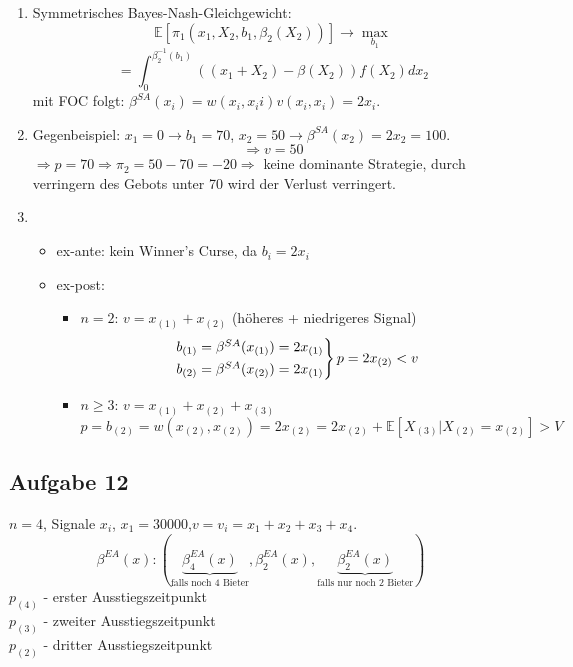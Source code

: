\documentclass[12pt]{extreport} %
\theoremstyle{named}
\theoremstyle{nnamed}
\theoremstyle{itshape}
\theoremstyle{normal}
\begin{document}
\begin{enumerate}[label=\alph*\upshape)]
	\item Symmetrisches Bayes-Nash-Gleichgewicht:
		$$ \mathds{E}[\pi_{1}\left( x_1, X_2, b_1, \beta_{2}(X_2)\right)] \longrightarrow \max_{b_{1}}  $$
		$$ = \int_{0}^{\beta_{2}^{-1}(b_{1})} \left( (x_1 + X_2) - \beta\left(X_{2}\right) \right)f(X_2) dx_2 $$
		mit FOC folgt: $\beta^{SA}(x_{i}) = w(x_i, x_ii) v(x_i, x_i) = 2x_i$.
	\item Gegenbeispiel: $x_1 = 0 \rightarrow b_1 = 70$, $x_2 = 50 \rightarrow \beta^{SA}(x_2) = 2x_2 = 100$.
		$$ \Rightarrow v = 50 $$
		$\Rightarrow p = 70 \Rightarrow \pi_2 = 50 - 70 = -20 \Rightarrow$ keine dominante Strategie, durch verringern des Gebots unter 70 wird der Verlust verringert.
	\item \begin{itemize}
		\item ex-ante: kein Winner's Curse, da $b_i = 2 x_i$
		\item ex-post: 
			\begin{itemize}
				\item $n = 2$: $v = x_{(1)} + x_{(2)}$ (höheres + niedrigeres Signal)
					$$ \begin{rcases}
						b_{(1)} = \beta^{SA}(x_{(1)}) = 2x_{(1)} \\
						b_{(2)} = \beta^{SA}(x_{(2)}) = 2x_{(1)}
					\end{rcases} p = 2x_{(2)} < v$$
				\item $n \geq 3$: $v = x_{(1)} + x_{(2)} + x_{(3)}$
					$$ p = b_{(2)} = w\left( x_{(2)}, x_{(2)} \right) = 2x_{(2)} = 2x_{(2)} + \mathds{E}\left[ X_{(3)} \big| X_{(2)} = x_{(2)} \right] > V $$
			\end{itemize}
	\end{itemize}
\end{enumerate}


\subsection*{Aufgabe 12}
$n = 4$, Signale $x_{i}$, $x_{1} = 30000$,$v = v_{i} = x_1 + x_2 + x_3 + x_4$.
$$ \beta^{EA}(x) : \left( \underbrace{\beta_{4}^{EA}(x)}_{\text{falls noch 4 Bieter}}, \beta_{2}^{EA}(x), \underbrace{\beta_{2}^{EA}(x)}_{\text{falls nur noch 2 Bieter}} \right) $$
$p_{(4)}$ - erster Ausstiegszeitpunkt ~\\
$p_{(3)}$ - zweiter Ausstiegszeitpunkt ~\\
$p_{(2)}$ - dritter Ausstiegszeitpunkt ~\\
\end{document}
